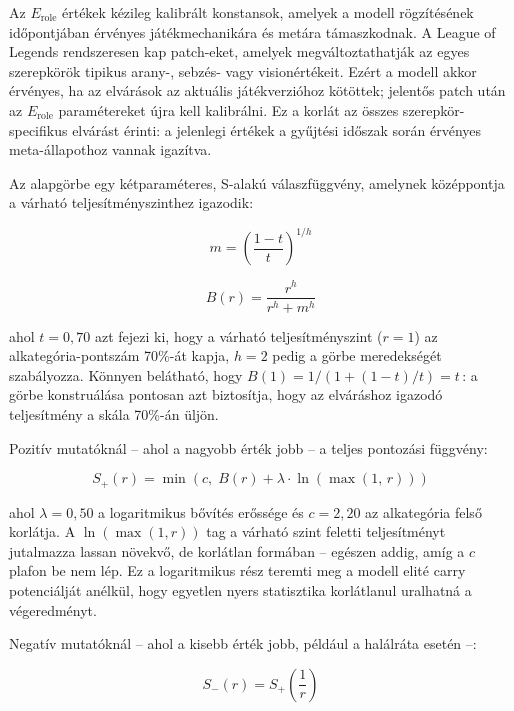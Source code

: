 ﻿\documentclass[a4paper,12pt]{report}
\begin{document}
Az $E_{\text{role}}$ értékek kézileg kalibrált konstansok, amelyek a modell rögzítésének időpontjában érvényes játékmechanikára és metára támaszkodnak. A League of Legends rendszeresen kap patch-eket, amelyek megváltoztathatják az egyes szerepkörök tipikus arany-, sebzés- vagy visionértékeit. Ezért a modell akkor érvényes, ha az elvárások az aktuális játékverzióhoz kötöttek; jelentős patch után az $E_{\text{role}}$ paramétereket újra kell kalibrálni. Ez a korlát az összes szerepkör-specifikus elvárást érinti: a jelenlegi értékek a gyűjtési időszak során érvényes meta-állapothoz vannak igazítva.

Az alapgörbe egy kétparaméteres, S-alakú válaszfüggvény, amelynek középpontja a várható teljesítményszinthez igazodik:

\begin{equation}
m = \left(\frac{1-t}{t}\right)^{1/h}
\end{equation}

\begin{equation}
B(r) = \frac{r^h}{r^h + m^h}
\end{equation}

ahol $t = 0{,}70$ azt fejezi ki, hogy a várható teljesítményszint ($r = 1$) az alkategória-pontszám 70\%-át kapja, $h = 2$ pedig a görbe meredekségét szabályozza. Könnyen belátható, hogy $B(1) = 1/(1 + (1-t)/t) = t$\,: a görbe konstruálása pontosan azt biztosítja, hogy az elváráshoz igazodó teljesítmény a skála 70\%-án üljön.

Pozitív mutatóknál -- ahol a nagyobb érték jobb -- a teljes pontozási függvény:

\begin{equation}
S_+(r) = \min\!\left(c,\; B(r) + \lambda \cdot \ln\!\left(\max(1,\, r)\right)\right)
\end{equation}

ahol $\lambda = 0{,}50$ a logaritmikus bővítés erőssége és $c = 2{,}20$ az alkategória felső korlátja. A $\ln(\max(1, r))$ tag a várható szint feletti teljesítményt jutalmazza lassan növekvő, de korlátlan formában -- egészen addig, amíg a $c$ plafon be nem lép. Ez a logaritmikus rész teremti meg a modell elité carry potenciálját anélkül, hogy egyetlen nyers statisztika korlátlanul uralhatná a végeredményt.

Negatív mutatóknál -- ahol a kisebb érték jobb, például a halálráta esetén --:

\begin{equation}
S_-(r) = S_+\!\left(\frac{1}{r}\right)
\end{equation}
\end{document}
